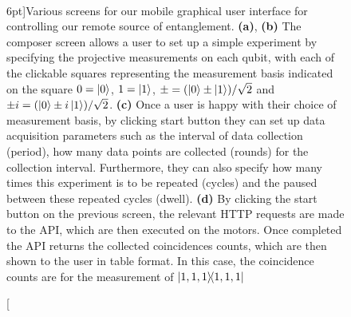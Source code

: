 \begin{figure}
	 \\
	\caption[Various screens for our mobile graphical user interface for controlling our remote source of entanglement.][6pt]{Various screens for our mobile graphical user interface for controlling our remote source of entanglement. \textbf{(a)}, \textbf{(b)} The composer screen allows a user to set up a simple experiment by specifying the projective measurements on each qubit, with each of the clickable squares representing the measurement basis indicated on the square ${0 = \ket{0}}$, ${1 = \ket{1}}$, ${\pm =(\ket{0} \pm \ket{1})/\sqrt{2}}$ and ${\pm i = (\ket{0}\pm i\ket{1})/\sqrt{2}}$. \textbf{(c)} Once a user is happy with their choice of measurement basis, by clicking start button they can set up data acquisition parameters such as the interval of data collection (period), how many data points are collected (rounds) for the collection interval. Furthermore, they can also specify how many times this experiment is to be repeated (cycles) and the paused between these repeated cycles (dwell). \textbf{(d)} By clicking the start button on the previous screen, the relevant  HTTP requests are made to the API, which are then executed on the motors. Once completed the \acs{API} returns the collected coincidences counts, which are then shown to the user in table format. In this case, the coincidence counts are for the measurement of $\op{1, 1, 1}$} 
\end{figure}

